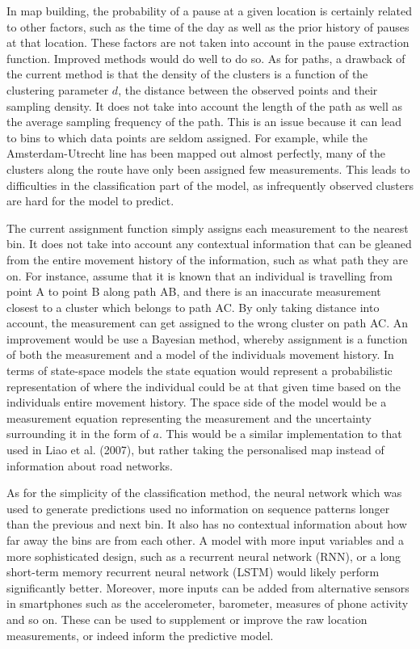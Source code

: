 \documentclass[man]{apa6}
\theoremstyle{definition}
\theoremstyle{definition}
\theoremstyle{definition}
\theoremstyle{remark}
\begin{document}
In map building, the probability of a pause at a given location is
certainly related to other factors, such as the time of the day as well
as the prior history of pauses at that location. These factors are not
taken into account in the pause extraction function. Improved methods
would do well to do so. As for paths, a drawback of the current method
is that the density of the clusters is a function of the clustering
parameter \(d\), the distance between the observed points and their
sampling density. It does not take into account the length of the path
as well as the average sampling frequency of the path. This is an issue
because it can lead to bins to which data points are seldom assigned.
For example, while the Amsterdam-Utrecht line has been mapped out almost
perfectly, many of the clusters along the route have only been assigned
few measurements. This leads to difficulties in the classification part
of the model, as infrequently observed clusters are hard for the model
to predict.

The current assignment function simply assigns each measurement to the
nearest bin. It does not take into account any contextual information
that can be gleaned from the entire movement history of the information,
such as what path they are on. For instance, assume that it is known
that an individual is travelling from point A to point B along path AB,
and there is an inaccurate measurement closest to a cluster which
belongs to path AC. By only taking distance into account, the
measurement can get assigned to the wrong cluster on path AC. An
improvement would be use a Bayesian method, whereby assignment is a
function of both the measurement and a model of the individuals movement
history. In terms of state-space models the state equation would
represent a probabilistic representation of where the individual could
be at that given time based on the individuals entire movement history.
The space side of the model would be a measurement equation representing
the measurement and the uncertainty surrounding it in the form of \(a\).
This would be a similar implementation to that used in Liao et al.
(2007), but rather taking the personalised map instead of information
about road networks.

As for the simplicity of the classification method, the neural network
which was used to generate predictions used no information on sequence
patterns longer than the previous and next bin. It also has no
contextual information about how far away the bins are from each other.
A model with more input variables and a more sophisticated design, such
as a recurrent neural network (RNN), or a long short-term memory
recurrent neural network (LSTM) would likely perform significantly
better. Moreover, more inputs can be added from alternative sensors in
smartphones such as the accelerometer, barometer, measures of phone
activity and so on. These can be used to supplement or improve the raw
location measurements, or indeed inform the predictive model.
\end{document}
